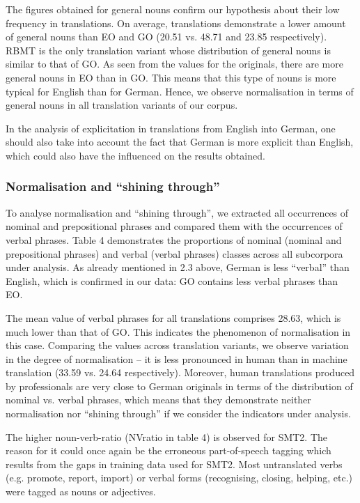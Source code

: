 \documentclass[output=paper]{LSP/langsci}
\begin{document}
The figures obtained for general nouns confirm our hypothesis about their low frequency in translations. On average, translations demonstrate a lower amount of general nouns than EO and GO (20.51 vs. 48.71 and 23.85 respectively). RBMT is the only translation variant whose distribution of general nouns is similar to that of GO. As seen from the values for the originals, there are more general nouns in EO than in GO. This means that this type of nouns is more typical for English than for German. Hence, we observe normalisation in terms of general nouns in all translation variants of our corpus. 

In the analysis of explicitation in translations from English into German, one should also take into account the fact that German is more explicit than English, which could also have the influenced on the results obtained.

\subsubsection{Normalisation and “shining through”}
 
To analyse normalisation and “shining through”, we extracted all occurrences of nominal and prepositional phrases and compared them with the occurrences of verbal phrases. Table 4 demonstrates the proportions of nominal (nominal and prepositional phrases) and verbal (verbal phrases) classes across all subcorpora under analysis. As already mentioned in 2.3 above, German is less “verbal” than English, which is confirmed in our data: GO contains less verbal phrases than EO.

The mean value of verbal phrases for all translations comprises 28.63, which is much lower than that of GO. This indicates the phenomenon of normalisation in this case. Comparing the values across translation variants, we observe variation in the degree of normalisation – it is less pronounced in human than in machine translation (33.59 vs. 24.64 respectively).  Moreover, human translations produced by professionals are very close to German originals in terms of the distribution of nominal vs. verbal phrases, which means that they demonstrate neither normalisation nor “shining through” if we consider the indicators under analysis.

The higher noun-verb-ratio (NVratio in table 4) is observed for SMT2. The reason for it could once again be the erroneous part-of-speech tagging which results from the gaps in training data used for SMT2. Most untranslated verbs (e.g. promote, report, import) or verbal forms (recognising, closing, helping, etc.) were tagged as nouns or adjectives.
\end{document}
